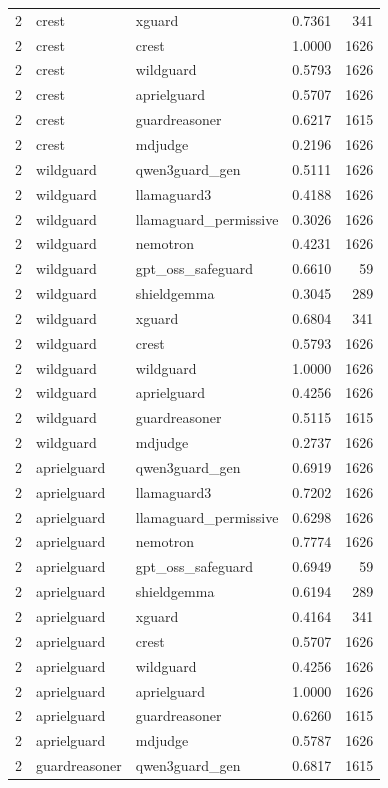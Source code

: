 \begin{tabular}{rllrr}
2 & crest & xguard & 0.7361 & 341 \\
2 & crest & crest & 1.0000 & 1626 \\
2 & crest & wildguard & 0.5793 & 1626 \\
2 & crest & aprielguard & 0.5707 & 1626 \\
2 & crest & guardreasoner & 0.6217 & 1615 \\
2 & crest & mdjudge & 0.2196 & 1626 \\
2 & wildguard & qwen3guard\_gen & 0.5111 & 1626 \\
2 & wildguard & llamaguard3 & 0.4188 & 1626 \\
2 & wildguard & llamaguard\_permissive & 0.3026 & 1626 \\
2 & wildguard & nemotron & 0.4231 & 1626 \\
2 & wildguard & gpt\_oss\_safeguard & 0.6610 & 59 \\
2 & wildguard & shieldgemma & 0.3045 & 289 \\
2 & wildguard & xguard & 0.6804 & 341 \\
2 & wildguard & crest & 0.5793 & 1626 \\
2 & wildguard & wildguard & 1.0000 & 1626 \\
2 & wildguard & aprielguard & 0.4256 & 1626 \\
2 & wildguard & guardreasoner & 0.5115 & 1615 \\
2 & wildguard & mdjudge & 0.2737 & 1626 \\
2 & aprielguard & qwen3guard\_gen & 0.6919 & 1626 \\
2 & aprielguard & llamaguard3 & 0.7202 & 1626 \\
2 & aprielguard & llamaguard\_permissive & 0.6298 & 1626 \\
2 & aprielguard & nemotron & 0.7774 & 1626 \\
2 & aprielguard & gpt\_oss\_safeguard & 0.6949 & 59 \\
2 & aprielguard & shieldgemma & 0.6194 & 289 \\
2 & aprielguard & xguard & 0.4164 & 341 \\
2 & aprielguard & crest & 0.5707 & 1626 \\
2 & aprielguard & wildguard & 0.4256 & 1626 \\
2 & aprielguard & aprielguard & 1.0000 & 1626 \\
2 & aprielguard & guardreasoner & 0.6260 & 1615 \\
2 & aprielguard & mdjudge & 0.5787 & 1626 \\
2 & guardreasoner & qwen3guard\_gen & 0.6817 & 1615 \\

\end{tabular}
